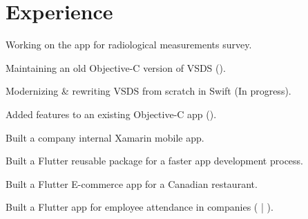 \documentclass[]{Resume}
\begin{document}
\hfill
\begin{minipage}[t]{0.63\textwidth} 


\section{Experience}

\vspace{\topsep} %
\begin{tightemize}
\item Working on the  app for radiological measurements survey.
\item Maintaining an old Objective-C version of VSDS ().
\item Modernizing \& rewriting VSDS from scratch in Swift (In progress).
\end{tightemize}
\sectionsep

\begin{tightemize}
\item Added features to an existing Objective-C app ().
\item Built a company internal Xamarin mobile app.
\item Built a Flutter reusable package for a faster app development process.
\item Built a Flutter E-commerce app for a Canadian restaurant.
\item Built a Flutter app for employee attendance in companies ( | ).
\end{tightemize}
\sectionsep


\end{minipage}
\end{document}
